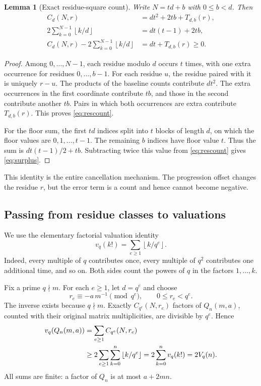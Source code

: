 \documentclass[11pt,a4paper]{article}
\numberwithin{equation}{section}
\newtheorem{lemma}[theorem]{Lemma}
\theoremstyle{definition}
\theoremstyle{remark}
\newcommand{\floor}[1]{\left\lfloor#1\right\rfloor}
\begin{document}
\begin{lemma}[Exact residue-square count]\label{lem:residue}
Write $N=td+b$ with $0\leq b<d$. Then
\begin{align}
 C_d(N,r)&=dt^2+2tb+T_{d,b}(r),\label{eq:rescount}\\
 2\sum_{k=0}^{N-1}\floor{k/d}&=dt(t-1)+2tb,\label{eq:floorsum}\\
 C_d(N,r)-2\sum_{k=0}^{N-1}\floor{k/d}&=dt+T_{d,b}(r)\geq0.\label{eq:surplus}
\end{align}
\end{lemma}
\begin{proof}
Among $0,\ldots,N-1$, each residue modulo $d$ occurs $t$ times, with one extra occurrence for residues $0,\ldots,b-1$. For each residue $u$, the residue paired with it is uniquely $r-u$. The products of the baseline counts contribute $dt^2$. The extra occurrences in the first coordinate contribute $tb$, and those in the second contribute another $tb$. Pairs in which both occurrences are extra contribute $T_{d,b}(r)$. This proves \eqref{eq:rescount}.

For the floor sum, the first $td$ indices split into $t$ blocks of length $d$, on which the floor values are $0,1,\ldots,t-1$. The remaining $b$ indices have floor value $t$. Thus the sum is $dt(t-1)/2+tb$. Subtracting twice this value from \eqref{eq:rescount} gives \eqref{eq:surplus}.
\end{proof}

This identity is the entire cancellation mechanism. The progression offset changes the residue $r$, but the error term is a count and hence cannot become negative.

\subsection{Passing from residue classes to valuations}
We use the elementary factorial valuation identity
\begin{equation}\label{eq:legendre}
 v_q(k!)=\sum_{e\geq1}\floor{k/q^e}.
\end{equation}
Indeed, every multiple of $q$ contributes once, every multiple of $q^2$ contributes one additional time, and so on. Both sides count the powers of $q$ in the factors $1,\ldots,k$.

Fix a prime $q\nmid m$. For each $e\geq1$, let $d=q^e$ and choose
\begin{equation}\label{eq:residueoffset}
 r_e\equiv-a\,m^{-1}\pmod{q^e},\qquad 0\leq r_e<q^e.
\end{equation}
The inverse exists because $q\nmid m$. Exactly $C_{q^e}(N,r_e)$ factors of $Q_n(m,a)$, counted with their original matrix multiplicities, are divisible by $q^e$. Hence
\begin{align}
 v_q(Q_n(m,a))
 &=\sum_{e\geq1}C_{q^e}(N,r_e)\notag\\
 &\geq 2\sum_{e\geq1}\sum_{k=0}^n\floor{k/q^e}
 =2\sum_{k=0}^n v_q(k!)=2V_q(n).\label{eq:cancellation}
\end{align}
All sums are finite: a factor of $Q_n$ is at most $a+2mn$.
\end{document}
